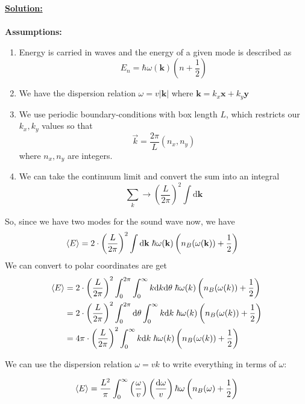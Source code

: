 \documentclass[11pt]{article}
\begin{document}
\vskip 0.5cm
\textbf{\underline{Solution:}}
\\
\\
\textbf{Assumptions:}
\begin{enumerate}
  \item Energy is carried in waves and the energy of a given mode is described as $$E_n = \hbar \omega(\mathbf{k}) \left(n + \frac{1}{2}\right) $$
  \item We have the dispersion relation $\omega = v|\mathbf{k}|$ where $\mathbf{k} = k_x \mathbf{x} + k_y \mathbf{y}$
  \item We use periodic boundary-conditions with box length $L$, which restricts our $k_x, k_y$ values so that 
  $$ \vec{k} = \frac{2\pi}{L} (n_x, n_y) $$ where $n_x, n_y$ are integers.
  \item We can take the continuum limit and convert the sum into an integral
  $$ \sum_{k} \rightarrow \left(\frac{L}{2\pi}\right)^2 \int \mathrm{d}\mathbf{k} $$
\end{enumerate}
So, since we have two modes for the sound wave now, we have 
\begin{align*}
  \langle E \rangle &= 2 \cdot \left(\frac{L}{2\pi}\right)^2 \int \mathrm{d}\mathbf{k} \; \hbar \omega(\mathbf{k}) \left( n_B(\omega(\mathbf{k})) + \frac{1}{2} \right)
\end{align*} We can convert to polar coordinates are get 
\begin{align*}
  \langle E \rangle &= 2 \cdot \left(\frac{L}{2\pi}\right)^2 \int_{0}^{2\pi} \int_{0}^{\infty} k \mathrm{d} k \mathrm{d} \theta \; \hbar \omega(k) \left( n_B(\omega(k)) + \frac{1}{2}  \right) \\
  &= 2 \cdot \left(\frac{L}{2\pi}\right)^2 \int_{0}^{2\pi} \mathrm{d} \theta \int_{0}^{\infty} k \mathrm{d} k  \; \hbar \omega(k) \left( n_B(\omega(k)) + \frac{1}{2}  \right) \\
  &= 4\pi \cdot \left(\frac{L}{2\pi}\right)^2 \int_{0}^{\infty} k \mathrm{d} k  \; \hbar \omega(k) \left( n_B(\omega(k)) + \frac{1}{2}  \right) \\
\end{align*}

We can use the dispersion relation $\omega = vk$ to write everything in terms of $\omega$:

\begin{align*}
  \langle E \rangle &= \frac{L^2}{\pi} \int_{0}^{\infty} \left(\frac{\omega}{v}\right) \left(\frac{\mathrm{d}\omega}{v}\right) \hbar \omega \left( n_B(\omega) + \frac{1}{2} \right) \\
\end{align*}
\end{document}

